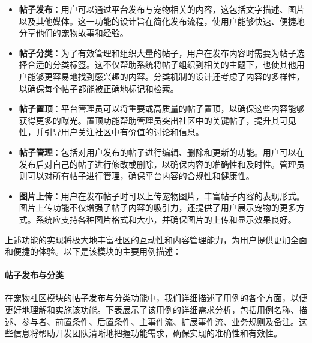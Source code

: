 \begin{itemize}
	\item \textbf{帖子发布}：用户可以通过平台发布与宠物相关的内容，这包括文字描述、图片以及其他媒体。这一功能的设计旨在简化发布流程，使用户能够快速、便捷地分享他们的宠物故事和经验。
	\item \textbf{帖子分类}：为了有效管理和组织大量的帖子，用户在发布内容时需要为帖子选择合适的分类标签。这不仅帮助系统将帖子组织到相关的主题下，也使其他用户能够更容易地找到感兴趣的内容。分类机制的设计还考虑了内容的多样性，以确保每个帖子都能被正确地标记和检索。
	\item \textbf{帖子置顶}：平台管理员可以将重要或高质量的帖子置顶，以确保这些内容能够获得更多的曝光。置顶功能帮助管理员突出社区中的关键帖子，提升其可见性，并引导用户关注社区中有价值的讨论和信息。
	\item \textbf{帖子管理}：包括对用户发布的帖子进行编辑、删除和更新的功能。用户可以在发布后对自己的帖子进行修改或删除，以确保内容的准确性和及时性。管理员则可以对所有帖子进行管理，确保平台内容的合规性和健康性。
	\item \textbf{图片上传}：用户在发布帖子时可以上传宠物图片，丰富帖子内容的表现形式。图片上传功能不仅增强了帖子内容的吸引力，还提供了用户展示宠物的更多方式。系统应支持各种图片格式和大小，并确保图片的上传和显示效果良好。
\end{itemize}

上述功能的实现将极大地丰富社区的互动性和内容管理能力，为用户提供更加全面和便捷的体验。以下是该模块的主要用例描述：

\paragraph{帖子发布与分类}

在宠物社区模块的帖子发布与分类功能中，我们详细描述了用例的各个方面，以便更好地理解和实施该功能。下表展示了该用例的详细需求分析，包括用例名称、描述、参与者、前置条件、后置条件、主事件流、扩展事件流、业务规则及备注。这些信息将帮助开发团队清晰地把握功能需求，确保实现的准确性和有效性。

